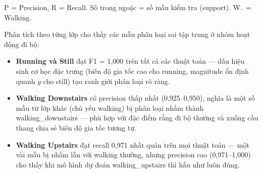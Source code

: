 \begin{table}[H]
    \centering
    \caption{Hiệu suất theo từng lớp --- bài toán 5 lớp, tập kiểm tra (229 mẫu)}
    \label{tab:perclass_5class}
    \begin{minipage}{\linewidth}
    \vspace{4pt}
    \footnotesize
    P = Precision, R = Recall. Số trong ngoặc = số mẫu kiểm tra (support). W.\ = Walking.
    \end{minipage}
\end{table}

Phân tích theo từng lớp cho thấy các mẫu phân loại sai tập trung ở nhóm hoạt động đi bộ:
\begin{itemize}
    \item \textbf{Running và Still} đạt F1 = 1,000 trên tất cả các thuật toán --- dấu hiệu sinh cơ học đặc trưng (biên độ gia tốc cao cho running, magnitude ổn định quanh $g$ cho still) tạo ranh giới phân loại rõ ràng.
    \item \textbf{Walking Downstairs} có precision thấp nhất (0,925--0,950), nghĩa là một số mẫu từ lớp khác (chủ yếu walking) bị phân loại nhầm thành walking\_downstairs --- phù hợp với đặc điểm rằng đi bộ thường và xuống cầu thang chia sẻ biên độ gia tốc tương tự.
    \item \textbf{Walking Upstairs} đạt recall 0,971 nhất quán trên mọi thuật toán --- một vài mẫu bị nhầm lẫn với walking thường, nhưng precision cao (0,971--1,000) cho thấy khi mô hình dự đoán walking\_upstairs thì hầu như luôn đúng.
\end{itemize}

